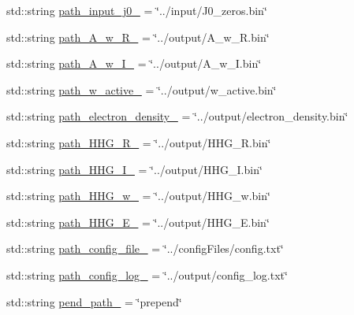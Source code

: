 \begin{DoxyCompactItemize}
\item 
std\+::string \hyperlink{class_config___settings_a6ab5ee2270acc68dc4757bb4bbe4dc9a}{path\+\_\+input\+\_\+j0\+\_\+} = \char`\"{}../input/J0\+\_\+zeros.\+bin\char`\"{}
\item 
std\+::string \hyperlink{class_config___settings_a0c22201375acb2a3d1b21ed40e59c023}{path\+\_\+\+A\+\_\+w\+\_\+\+R\+\_\+} = \char`\"{}../output/A\+\_\+w\+\_\+\+R.\+bin\char`\"{}
\item 
std\+::string \hyperlink{class_config___settings_a3dcb5a142b7887861ed876cda1e20278}{path\+\_\+\+A\+\_\+w\+\_\+\+I\+\_\+} = \char`\"{}../output/A\+\_\+w\+\_\+\+I.\+bin\char`\"{}
\item 
std\+::string \hyperlink{class_config___settings_a1ff4681e3b54641447dc069520a7df0e}{path\+\_\+w\+\_\+active\+\_\+} = \char`\"{}../output/w\+\_\+active.\+bin\char`\"{}
\item 
std\+::string \hyperlink{class_config___settings_a43616eb0aeec1c10f069a082da0747b5}{path\+\_\+electron\+\_\+density\+\_\+} = \char`\"{}../output/electron\+\_\+density.\+bin\char`\"{}
\item 
std\+::string \hyperlink{class_config___settings_a77768505a27e3c26e4d3ef2b64323b40}{path\+\_\+\+H\+H\+G\+\_\+\+R\+\_\+} = \char`\"{}../output/H\+H\+G\+\_\+\+R.\+bin\char`\"{}
\item 
std\+::string \hyperlink{class_config___settings_afb0c5bf49c8e3b78257b836d8d106afe}{path\+\_\+\+H\+H\+G\+\_\+\+I\+\_\+} = \char`\"{}../output/H\+H\+G\+\_\+\+I.\+bin\char`\"{}
\item 
std\+::string \hyperlink{class_config___settings_a6984acf5e1b155aeaaf0e7e58ed6f824}{path\+\_\+\+H\+H\+G\+\_\+w\+\_\+} = \char`\"{}../output/H\+H\+G\+\_\+w.\+bin\char`\"{}
\item 
std\+::string \hyperlink{class_config___settings_af98b88ff5e28c5bf0cc74e505ce58968}{path\+\_\+\+H\+H\+G\+\_\+\+E\+\_\+} = \char`\"{}../output/H\+H\+G\+\_\+\+E.\+bin\char`\"{}
\item 
std\+::string \hyperlink{class_config___settings_a9cd50590f5b9bb44827a2c04afb8e6ea}{path\+\_\+config\+\_\+file\+\_\+} = \char`\"{}../config\+Files/config.\+txt\char`\"{}
\item 
std\+::string \hyperlink{class_config___settings_acd2e270119849e906cb8320f27bc7e49}{path\+\_\+config\+\_\+log\+\_\+} = \char`\"{}../output/config\+\_\+log.\+txt\char`\"{}
\item 
std\+::string \hyperlink{class_config___settings_a1a8644dbc79569431abca5e4afe9081d}{pend\+\_\+path\+\_\+} = \char`\"{}prepend\char`\"{}

\end{DoxyCompactItemize}
